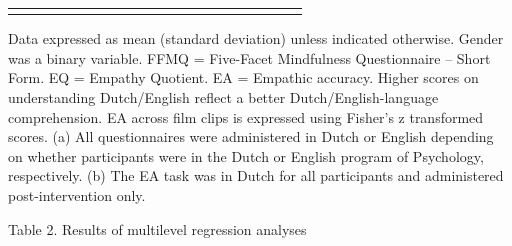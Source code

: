 \documentclass[authordate, empirical]{jote-new-article}
\begin{document}
\begin{table}
\begin{fullwidth}
\begin{tabularx}{\linewidth}{@{} l l l l l l l l l l l l l l l l l l l l l  @{}}
\bottomrule
                                                                \\
    \end{tabularx}
    Data expressed as mean (standard deviation) unless indicated otherwise. Gender was a binary variable. FFMQ = Five-Facet Mindfulness Questionnaire -- Short Form. EQ = Empathy Quotient. EA = Empathic accuracy. Higher scores on understanding Dutch/English reflect a better Dutch/English-language comprehension. EA across film clips is expressed using Fisher's z transformed scores. (a) All questionnaires were administered in Dutch or English depending on whether participants were in the Dutch or English program of Psychology, respectively. (b) The EA task was in Dutch for all participants and administered post-intervention only.
\end{fullwidth}
\end{table}





Table 2. Results of multilevel regression analyses
\end{document}
